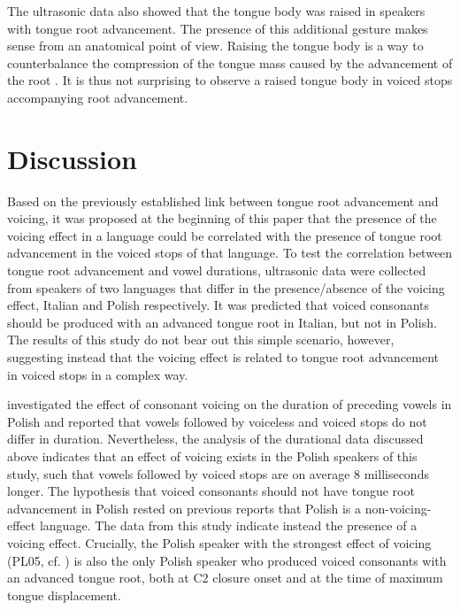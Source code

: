 \documentclass[authoryear, 5p]{elsarticle}
\begin{document}
The ultrasonic data also showed that the tongue body was raised in
speakers with tongue root advancement. The presence of this additional
gesture makes sense from an anatomical point of view. Raising the tongue
body is a way to counterbalance the compression of the tongue mass
caused by the advancement of the root
\citep{perkell1969, jackson1988, sproat1993, kingston1997, fulop1998}.
It is thus not surprising to observe a raised tongue body in voiced
stops accompanying root advancement.

\section{Discussion}\label{discussion}

\label{s:discussion}

Based on the previously established link between tongue root advancement
and voicing, it was proposed at the beginning of this paper that the
presence of the voicing effect in a language could be correlated with
the presence of tongue root advancement in the voiced stops of that
language. To test the correlation between tongue root advancement and
vowel durations, ultrasonic data were collected from speakers of two
languages that differ in the presence/absence of the voicing effect,
Italian and Polish respectively. It was predicted that voiced consonants
should be produced with an advanced tongue root in Italian, but not in
Polish. The results of this study do not bear out this simple scenario,
however, suggesting instead that the voicing effect is related to tongue
root advancement in voiced stops in a complex way.

\citet{keating1984} investigated the effect of consonant voicing on the
duration of preceding vowels in Polish and reported that vowels followed
by voiceless and voiced stops do not differ in duration. Nevertheless,
the analysis of the durational data discussed above indicates that an
effect of voicing exists in the Polish speakers of this study, such that
vowels followed by voiced stops are on average 8 milliseconds longer.
The hypothesis that voiced consonants should not have tongue root
advancement in Polish rested on previous reports that Polish is a
non-voicing-effect language. The data from this study indicate instead
the presence of a voicing effect. Crucially, the Polish speaker with the
strongest effect of voicing (PL05, cf. ) is also
the only Polish speaker who produced voiced consonants with an advanced
tongue root, both at C2 closure onset and at the time of maximum tongue
displacement.
\end{document}
